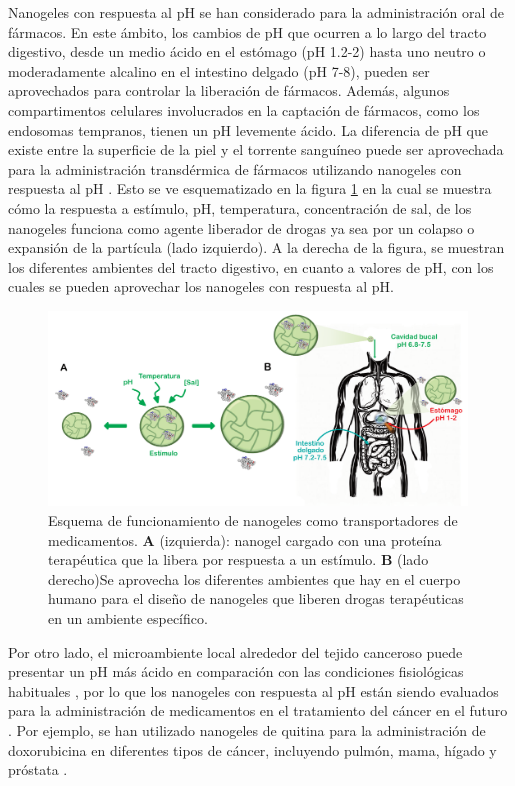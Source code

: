 Nanogeles con respuesta al pH se han considerado para la administraci\'on oral de f\'armacos. En este \'ambito, los cambios de pH que ocurren a lo largo del tracto digestivo, desde un medio \'acido en el est\'omago (pH 1.2-2) hasta uno neutro o moderadamente alcalino en el intestino delgado (pH 7-8), pueden ser aprovechados para controlar la liberaci\'on de f\'armacos.
Adem\'as, algunos compartimentos celulares involucrados en la captaci\'on de f\'armacos, como los endosomas tempranos, tienen un pH levemente \'acido. La diferencia de pH que existe entre la superficie de la piel y el torrente sangu\'ineo puede ser aprovechada para la administraci\'on transd\'ermica de f\'armacos utilizando nanogeles con respuesta al pH \cite{qindeel2019development}.
Esto se ve esquematizado en la figura \ref{fig:intro:sistema} en la cual se muestra c\'omo la respuesta a est\'imulo, pH, temperatura, concentraci\'on de sal,  de los nanogeles funciona como agente liberador de drogas ya sea por un colapso o expansi\'on de la part\'icula (lado izquierdo).
A la derecha de la figura, se muestran los diferentes ambientes del tracto digestivo, en cuanto a valores de pH, con los cuales se pueden aprovechar los nanogeles con respuesta al pH.


\begin{figure}
	\centering
	\includegraphics[width=0.99\textwidth]{Figures/modelos/sistema.pdf}
	\caption{Esquema de funcionamiento de nanogeles como transportadores de medicamentos. 
		\textbf{A} (izquierda): nanogel cargado con una prote\'ina terap\'eutica que la libera por respuesta a un est\'imulo. \textbf{B} (lado derecho)Se aprovecha los diferentes ambientes que hay en el cuerpo humano para el dise\~no de nanogeles que liberen drogas terap\'euticas en un ambiente espec\'ifico. }
	\label{fig:intro:sistema}
\end{figure}

Por otro lado, el microambiente local alrededor del tejido canceroso puede presentar un pH m\'as \'acido en comparaci\'on con las condiciones fisiol\'ogicas habituales \cite{lawson1963breast,tannock1989acid,gerweck2006tumor}, por lo que los nanogeles con respuesta al pH est\'an siendo evaluados para la administraci\'on de medicamentos en el tratamiento del c\'ancer en el futuro \cite{peng2013controlled,kanamala2016mechanisms}. Por ejemplo, se han utilizado nanogeles de quitina para la administraci\'on de doxorubicina en diferentes tipos de c\'ancer, incluyendo pulm\'on, mama, h\'igado y pr\'ostata \cite{jayakumar2012doxorubicin}.

